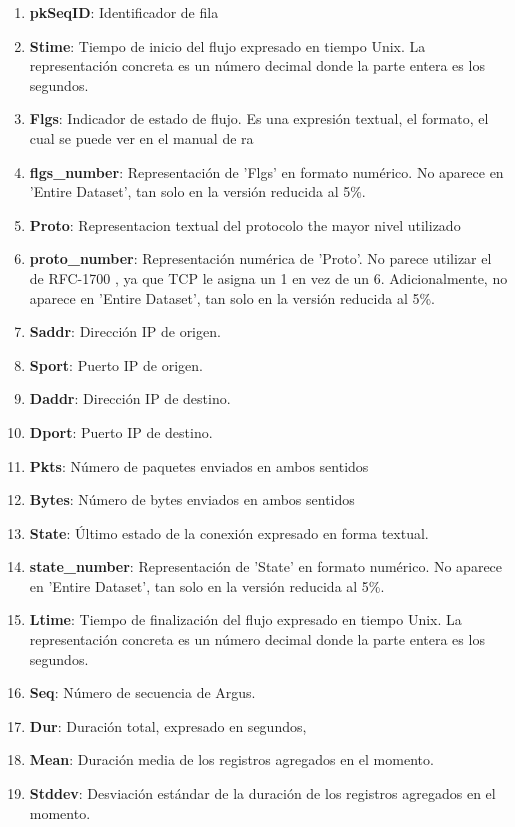 \begin{enumerate}
    \item \textbf{pkSeqID}: Identificador de fila
    \item \textbf{Stime}: Tiempo de inicio del flujo expresado en tiempo Unix. La representación concreta es un número decimal donde la parte entera es los segundos.
    \item \textbf{Flgs}: Indicador de estado de flujo. Es una expresión textual, el formato, el cual se puede ver en el manual de ra \cite{ratool}
    \item \textbf{flgs\_number}: Representación de 'Flgs' en formato numérico. No aparece en 'Entire Dataset', tan solo en la versión reducida al 5\%.
    \item \textbf{Proto}: Representacion textual del protocolo the mayor nivel utilizado
    \item \textbf{proto\_number}: Representación numérica de 'Proto'. No parece utilizar el de RFC-1700 \cite{rfc1700}, ya que TCP le asigna un 1 en vez de un 6. Adicionalmente, no aparece en 'Entire Dataset', tan solo en la versión reducida al 5\%.
    \item \textbf{Saddr}: Dirección IP de origen.
    \item \textbf{Sport}: Puerto IP de origen.
    \item \textbf{Daddr}: Dirección IP de destino.
    \item \textbf{Dport}: Puerto IP de destino.
    \item \textbf{Pkts}: Número de paquetes enviados en ambos sentidos
    \item \textbf{Bytes}: Número de bytes enviados en ambos sentidos
    \item \textbf{State}: Último estado de la conexión expresado en forma textual.
    \item \textbf{state\_number}: Representación de 'State' en formato numérico. No aparece en 'Entire Dataset', tan solo en la versión reducida al 5\%.
    \item \textbf{Ltime}: Tiempo de finalización del flujo expresado en tiempo Unix. La representación concreta es un número decimal donde la parte entera es los segundos.
    \item \textbf{Seq}: Número de secuencia de Argus.
    \item \textbf{Dur}: Duración total, expresado en segundos,
    \item \textbf{Mean}: Duración media de los registros agregados en el momento.
    \item \textbf{Stddev}: Desviación estándar de la duración de los registros agregados en el momento.

\end{enumerate}
